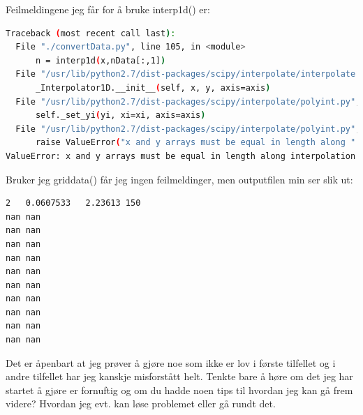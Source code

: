 Feilmeldingene jeg får for å bruke interp1d() er: 
\begin{lstlisting}[style=formattednumber,frame=none, language=bash]
Traceback (most recent call last):
  File "./convertData.py", line 105, in <module>
      n = interp1d(x,nData[:,1])
  File "/usr/lib/python2.7/dist-packages/scipy/interpolate/interpolate.py", line 333, in __init__
      _Interpolator1D.__init__(self, x, y, axis=axis)
  File "/usr/lib/python2.7/dist-packages/scipy/interpolate/polyint.py", line 35, in __init__
      self._set_yi(yi, xi=xi, axis=axis)
  File "/usr/lib/python2.7/dist-packages/scipy/interpolate/polyint.py", line 94, in _set_yi
      raise ValueError("x and y arrays must be equal in length along "
ValueError: x and y arrays must be equal in length along interpolation axis.
\end{lstlisting}

Bruker jeg griddata() får jeg ingen feilmeldinger, men outputfilen min ser slik ut:
\begin{lstlisting}[style=formattednumber,frame=none, language=bash]
2	0.0607533	2.23613	150
nan	nan
nan	nan
nan	nan
nan	nan
nan	nan
nan	nan
nan	nan
nan	nan
nan	nan
nan	nan
\end{lstlisting}
Det er åpenbart at jeg prøver å gjøre noe som ikke er lov i første tilfellet og i andre tilfellet 
har jeg kanskje misforstått helt. Tenkte bare å høre om det jeg har startet å gjøre 
er fornuftig og om du hadde noen tips til hvordan jeg kan gå frem videre? Hvordan jeg evt.
kan løse problemet eller gå rundt det.

